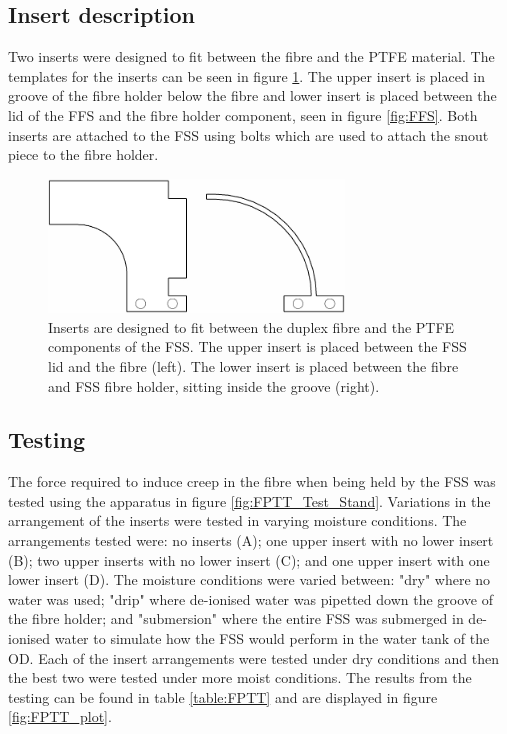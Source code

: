 \subsection{Insert description}
Two inserts were designed to fit between the fibre and the PTFE material. The templates for the inserts can be seen in figure \ref{fig:inserts}. The upper insert is placed in groove of the fibre holder below the fibre and lower insert is placed between the lid of the FFS and the fibre holder component, seen in figure \ref{fig:FFS}. Both inserts are attached to the FSS using bolts which are used to attach the snout piece to the fibre holder.

\begin{figure}[h!]
    \centering
    \includegraphics[width=0.7\textwidth]{Figures/Slip_inserts.jpg}
    \caption{Inserts are designed to fit between the duplex fibre and the PTFE components of the FSS. The upper insert is placed between the FSS lid and the fibre (left). The lower insert is placed between the fibre and FSS fibre holder, sitting inside the groove (right).}
    \label{fig:inserts}
\end{figure}

\subsection{Testing}
The force required to induce creep in the fibre when being held by the FSS was tested using the apparatus in figure \ref{fig:FPTT_Test_Stand}. Variations in the arrangement of the inserts were tested in varying moisture conditions. The arrangements tested were: no inserts (A); one upper insert with no lower insert (B); two upper inserts with no lower insert (C); and one upper insert with one lower insert (D). The moisture conditions were varied between: "dry" where no water was used; "drip" where de-ionised water was pipetted down the groove of the fibre holder; and "submersion" where the entire FSS was submerged in de-ionised water to simulate how the FSS would perform in the water tank of the OD. Each of the insert arrangements were tested under dry conditions and then the best two were tested under more moist conditions. The results from the testing can be found in table \ref{table:FPTT} and are displayed in figure \ref{fig:FPTT_plot}. 


